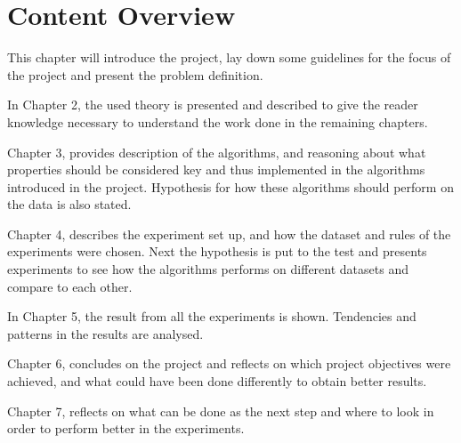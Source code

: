 \section{Content Overview}
This chapter will introduce the project, lay down some guidelines for the focus of the project and present the problem definition.

In Chapter 2, the used theory is presented and described to give the reader knowledge necessary to understand the work done in the remaining chapters.

Chapter 3, provides description of the algorithms, and reasoning about what properties should be considered key and thus implemented in the algorithms introduced in the project. Hypothesis for how these algorithms should perform on the data is also stated.

Chapter 4, describes the experiment set up, and how the dataset and rules of the experiments were chosen. Next the hypothesis is put to the test and presents experiments to see how the algorithms performs on different datasets and compare to each other.

In Chapter 5, the result from all the experiments is shown. Tendencies and patterns in the results are analysed.

Chapter 6, concludes on the project and reflects on which project objectives were achieved, and what could have been done differently to obtain better results.

Chapter 7, reflects on what can be done as the next step and where to look in order to perform better in the experiments.